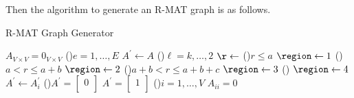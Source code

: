 Then the algorithm to generate an R-MAT graph is as follows.
\par
\begin{algorithm}[H]\label{algo:R-MAT-graph-generator-algo}
	\DontPrintSemicolon
	\caption{R-MAT Graph Generator}
	\BlankLine

	\(A_{V\times V} = 0_{V \times V}\) 
	\;
	\For(){\(e= 1, \ldots , E\)}{
		\(A^\prime \gets A\)\;
		\For(){\(\ell = k, \ldots , 2\)}{
			\(\r\gets \)\rand{\([0, 1]\)} \;
			\If(){\(r\leq a\) }{
				\(\region\gets 1\)\;
			}\ElseIf(){\(a < r \leq  a + b\)}{
				\(\region\gets 2\)\;
			}\ElseIf(){\(a + b < r \leq  a + b + c\)}{
				\(\region\gets 3\)\;
			}\Else(){
				\(\region\gets 4\)\;
			}
			\(A^\prime \gets A^\prime_i\)
		}
		\If(){\(A^\prime = \begin{bmatrix}0 \\\end{bmatrix}\)}{
			\(A^\prime = \begin{bmatrix}1 \\ \end{bmatrix}\)
		}
	}
	\;
	\For(){\(i = 1, \ldots, V\)}{
		\(A_{ii} = 0\)\label{algo:R-MAT-graph-generator-algo-clean-up}
	}
	\;
\end{algorithm}

